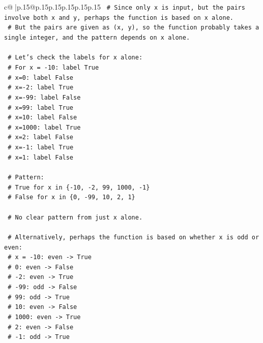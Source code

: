 \documentclass{article}
\begin{document}
{\begin{supertabular}{c@{$\;$}|p{.15\linewidth}@{}p{.15\linewidth}p{.15\linewidth}p{.15\linewidth}p{.15\linewidth}p{.15\linewidth}}
{{{\texttt{    \# Since only x is input, but the pairs involve both x and y, perhaps the function is based on x alone.} \\
\texttt{    \# But the pairs are given as (x, y), so the function probably takes a single integer, and the pattern depends on x alone.} \\
\\ 
\texttt{    \# Let's check the labels for x alone:} \\
\texttt{    \# For x = {-}10: label True} \\
\texttt{    \# x=0: label False} \\
\texttt{    \# x={-}2: label True} \\
\texttt{    \# x={-}99: label False} \\
\texttt{    \# x=99: label True} \\
\texttt{    \# x=10: label False} \\
\texttt{    \# x=1000: label True} \\
\texttt{    \# x=2: label False} \\
\texttt{    \# x={-}1: label True} \\
\texttt{    \# x=1: label False} \\
\\ 
\texttt{    \# Pattern:} \\
\texttt{    \# True for x in \{{-}10, {-}2, 99, 1000, {-}1\}} \\
\texttt{    \# False for x in \{0, {-}99, 10, 2, 1\}} \\
\\ 
\texttt{    \# No clear pattern from just x alone.} \\
\\ 
\texttt{    \# Alternatively, perhaps the function is based on whether x is odd or even:} \\
\texttt{    \# x = {-}10: even {-}> True} \\
\texttt{    \# 0: even {-}> False} \\
\texttt{    \# {-}2: even {-}> True} \\
\texttt{    \# {-}99: odd {-}> False} \\
\texttt{    \# 99: odd {-}> True} \\
\texttt{    \# 10: even {-}> False} \\
\texttt{    \# 1000: even {-}> True} \\
\texttt{    \# 2: even {-}> False} \\
\texttt{    \# {-}1: odd {-}> True} \\
}}}
\end{supertabular}}
\end{document}
